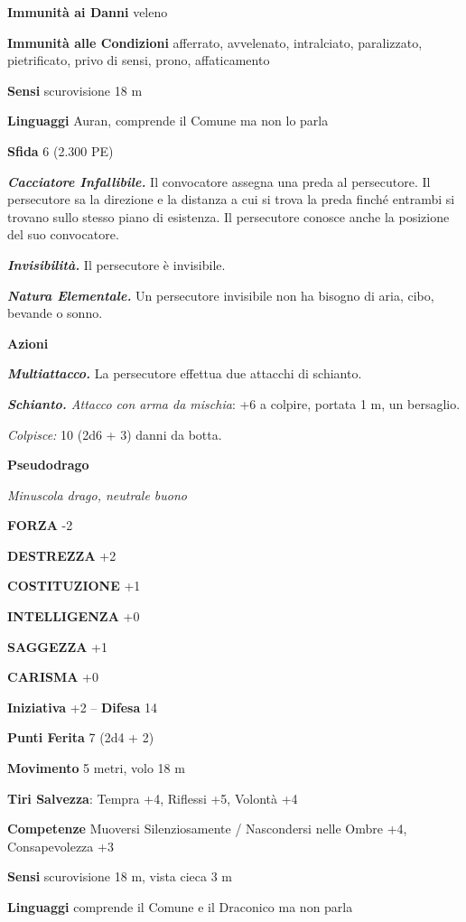 \begin{multicols}{2}
\textbf{Immunità ai Danni} veleno

\textbf{Immunità alle Condizioni} afferrato, avvelenato, intralciato, paralizzato, pietrificato, privo di sensi, prono, affaticamento

\textbf{Sensi} scurovisione 18 m

\textbf{Linguaggi} Auran, comprende il Comune ma non lo parla

\textbf{Sfida} 6 (2.300 PE)

\emph{\textbf{Cacciatore Infallibile.}} Il convocatore assegna una preda
al persecutore. Il persecutore sa la direzione e la distanza a cui si
trova la preda finché entrambi si trovano sullo stesso piano di
esistenza. Il persecutore conosce anche la posizione del suo
convocatore.

\emph{\textbf{Invisibilità.}} Il persecutore è invisibile.

\emph{\textbf{Natura Elementale.}} Un persecutore invisibile non ha bisogno di aria, cibo, bevande o sonno.

\textbf{Azioni}

\emph{\textbf{Multiattacco.}} La persecutore effettua due attacchi di schianto.

\emph{\textbf{Schianto.} Attacco con arma da mischia}: +6 a colpire, portata 1 m, un bersaglio.

\emph{Colpisce:} 10 (2d6 + 3) danni da botta.

\medskip{}\textbf{Pseudodrago}

\emph{Minuscola drago, neutrale buono}

\textbf{FORZA} -2

\textbf{DESTREZZA} +2

\textbf{COSTITUZIONE} +1

\textbf{INTELLIGENZA} +0

\textbf{SAGGEZZA} +1

\textbf{CARISMA} +0

\textbf{Iniziativa} +2 -- \textbf{Difesa} 14

\textbf{Punti Ferita} 7 (2d4 + 2)

\textbf{Movimento} 5 metri, volo 18 m

\textbf{Tiri Salvezza}: Tempra +4, Riflessi +5, Volontà +4

\textbf{Competenze} Muoversi Silenziosamente / Nascondersi nelle Ombre +4, Consapevolezza +3

\textbf{Sensi} scurovisione 18 m, vista cieca 3 m

\textbf{Linguaggi} comprende il Comune e il Draconico ma non parla


\end{multicols}
